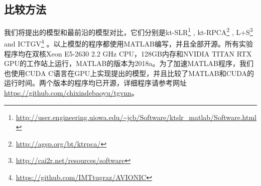 \subsection{比较方法}
我们将提出的模型和最前沿的模型对比，它们分别是kt-SLR\footnote{\url{http://user.engineering.uiowa.edu/~jcb/Software/ktslr_matlab/Software.html}} \cite{Sajan2011Accelerated}, kt-RPCA\footnote{\url{http://agsp.org/bt/ktrpca/}} \cite{tremoulheac}, L+S\footnote{\url{http://cai2r.net/resources/software}} \cite{lpluss} and ICTGV\footnote{\url{https://github.com/IMTtugraz/AVIONIC}} \cite{infimaltgv}。以上模型的程序都使用MATLAB编写，并且全部开源。所有实验程序均在双核Xeon E5-2630 2.2 GHz CPU，128GB内存和NVIDIA TITAN RTX GPU的工作站上运行，MATLAB的版本为2018a。为了加速MATLAB程序，我们也使用CUDA C语言在GPU上实现提出的模型，并且比较了MATLAB和CUDA的运行时间。两个版本的程序均已开源，详细程序请参考网址\url{https://github.com/chixindebaoyu/tgvnn}。

